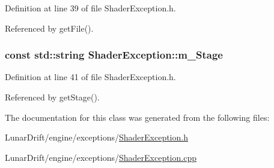 Definition at line 39 of file Shader\+Exception.\+h.



Referenced by get\+File().

\subsubsection[{\texorpdfstring{m\+\_\+\+Stage}{m_Stage}}]{\setlength{\rightskip}{0pt plus 5cm}const std\+::string Shader\+Exception\+::m\+\_\+\+Stage\hspace{0.3cm}{\ttfamily [private]}}\hypertarget{class_shader_exception_aa6b0663a6cca810a07367f21f77a9c43}{}\label{class_shader_exception_aa6b0663a6cca810a07367f21f77a9c43}


Definition at line 41 of file Shader\+Exception.\+h.



Referenced by get\+Stage().



The documentation for this class was generated from the following files\+:\begin{DoxyCompactItemize}
\item 
Lunar\+Drift/engine/exceptions/\hyperlink{_shader_exception_8h}{Shader\+Exception.\+h}\item 
Lunar\+Drift/engine/exceptions/\hyperlink{_shader_exception_8cpp}{Shader\+Exception.\+cpp}\end{DoxyCompactItemize}
